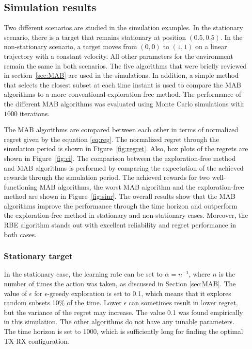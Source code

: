 \documentclass[english, 12pt, a4paper, elec, utf8, a-1b, online]{aaltothesis}
\begin{document}
\subsection{Simulation results}

Two different scenarios are studied in the simulation examples. 
In the stationary scenario, there is a target that remains stationary at position $(0.5, 0.5)$.
In the non-stationary scenario, a target moves from $(0, 0)$ to $(1, 1)$ on a linear trajectory with a constant velocity.
All other parameters for the environment remain the same in both scenarios.
The five algorithms that were briefly reviewed in section~\ref{sec:MAB} are used in the simulations.
In addition, a simple method that selects the closest subset at each time instant is used to compare the MAB algorithms to a more conventional exploration-free method. 
The performance of the different MAB algorithms was evaluated using Monte Carlo simulations with $1000$ iterations.

The MAB algorithms are compared between each other in terms of normalized regret given by the equation \eqref{eq:reg}. 
The normalized regret through the simulation period is shown in Figure~\ref{fig:regret}.
Also, box plots of the regrets are shown in Figure~\ref{fig:ci}.
The comparison between the exploration-free method and MAB algorithms is performed by comparing the expectation of the achieved rewards through the simulation period.
The achieved rewards for two well-functioning MAB algorithms, 
the worst MAB algorithm and the exploration-free method are shown in Figure~\ref{fig:sinr}.
The overall results show that the MAB algorithms improve the performance through the time horizon and outperform the exploration-free method in stationary and non-stationary cases.
Moreover, the RBE algorithm stands out with excellent reliability and regret performance in both cases.

\subsubsection{Stationary target}

In the stationary case, the learning rate can be set to $\alpha=n^{-1}$, where $n$ is the number of times the action was taken, as discussed in Section \ref{sec:MAB}.
The value of $\epsilon$ for $\epsilon$-greedy exploration is set to 0.1, which means that it explores random subsets 10\% of the time.
Lower $\epsilon$ can sometimes result in lower regret, but the variance of the regret may increase.
The value 0.1 was found empirically in this simulation.
The other algorithms do not have any tunable parameters.
The time horizon is set to 1000, which is sufficiently long for finding the optimal TX-RX configuration.
\end{document}
